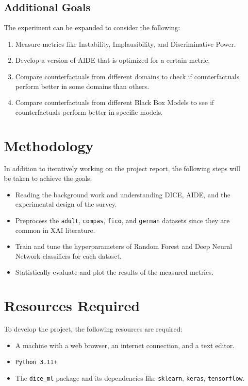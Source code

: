 \documentclass[a4paper,12pt]{article}
\begin{document}
\subsection*{Additional Goals}
The experiment can be expanded to consider the following:

\begin{enumerate}
\item Measure metrics like Instability, Implausibility, and Discriminative Power.
\item Develop a version of AIDE that is optimized for a certain metric.
\item Compare counterfactuals from different domains to check if counterfactuals perform better in some domains than others.
\item Compare counterfactuals from different Black Box Models to see if counterfactuals perform better in specific models.
\end{enumerate}



\section*{Methodology}
In addition to iteratively working on the project report, the following steps will be taken to achieve the goals:

\begin{itemize}
\item Reading the background work and understanding DICE, AIDE, and the experimental design of the survey.
\item Preprocess the \verb|adult|, \verb|compas|, \verb|fico|, and \verb|german| datasets since they are common in XAI literature.
\item Train and tune the hyperparameters of Random Forest and Deep Neural Network classifiers for each dataset. 
\item Statistically evaluate and plot the results of the measured metrics.
\end{itemize}

\section*{Resources Required}
To develop the project, the following resources are required:

\begin{itemize}
\item A machine with a web browser, an internet connection, and a text editor.
\item \verb|Python 3.11+|
\item The \verb|dice_ml| package and its dependencies like \verb|sklearn|, \verb|keras|, \verb|tensorflow|. 
\end{itemize}
\end{document}
